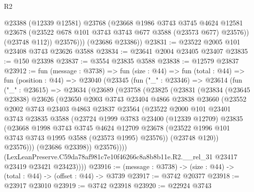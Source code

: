 \begin{lexlean}{R2}
\begin{coremodule}
              @23388
              (@12339 @12581)
              @23768
              (@23668
                @1986
                @3743
                @3745
                @4624
                @12581
                @23678
                (@23522 @678 @101 @3743 @3743 @677 @3588 (@23573 @677) @23576))
              (@23748 @112))
            @23576)))
      (@23686 @23386))
@23831 := @23522 @2005 @101 @23408 @3743 @23626 @3588
@23834 := @23641 @2004 @23405 @23407
@23835 := @150 @23398
@23837 := @3554 @23835 @3588
@23838 := @12579 @23837
@23912 := fun (message : @3738) =>
  fun (size : @44) =>
  fun (total : @44) =>
  fun (position : @44) =>
  @23040
    (@23345
      (fun ("_" : @23346) =>
      @23614
        (fun ("_" : @23615) =>
        @23634
          (@23689
            (@23758
              (@23825
                (@23831
                  (@23834
                    (@23645 @23838)
                    @23626
                    (@23650
                      @2003
                      @3743
                      @23404
                      @4866
                      @23838
                      @23660
                      (@23552
                        @2002
                        @3743
                        @23403
                        @4863
                        @23837
                        @23564
                        (@23522
                          @2000
                          @101
                          @23401
                          @3743
                          @23835
                          @3588
                          (@23724
                            @1999
                            @3783
                            @23400
                            (@12339 @12709)
                            @23835
                            (@23668
                              @1998
                              @3743
                              @3745
                              @4624
                              @12709
                              @23678
                              (@23522 @1996 @101 @3743 @3743 @1995 @3588 (@23573 @1995) @23576))
                            (@23748 @120))
                          @23576)))
                    (@23686 @23398))
                  @23576))))
          (LexLeanPreserve.C59da78af981c7e10f46266c8a8b8b11e.R2.__rel_31
            @23417
            @23419
            @23421
            @23423))))
@23916 := (message : @3738) -> (size : @44) -> (total : @44) -> (offset : @44) -> @3739
@23917 := @3742 @20377
@23918 := @23917 @23010
@23919 := @3742 @23918
@23920 := @22924 @3743

\end{coremodule}
\end{lexlean}
